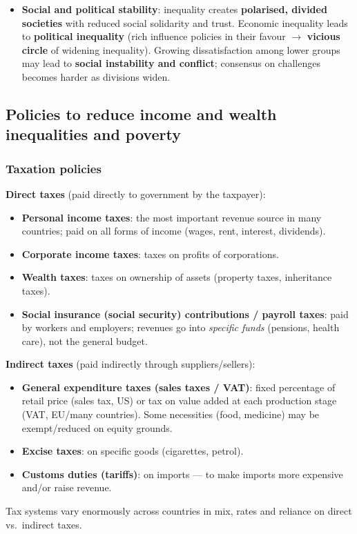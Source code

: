 \begin{itemize}
\begin{itemize}
    \item \textbf{Social problems}: crime, drug use, family breakdowns, homelessness.
    \item \textbf{Inability to realise full potential} $\to$ waste of human talent $\to$ lower growth (PPC/LRAS shift less).
  \end{itemize}
  \item \textbf{Social and political stability}: inequality creates \textbf{polarised, divided societies} with reduced social solidarity and trust. Economic inequality leads to \textbf{political inequality} (rich influence policies in their favour $\to$ \textbf{vicious circle} of widening inequality). Growing dissatisfaction among lower groups may lead to \textbf{social instability and conflict}; consensus on challenges becomes harder as divisions widen.
\end{itemize}
\subsection{Policies to reduce income and wealth inequalities and poverty}
\subsubsection*{Taxation policies}
\textbf{Direct taxes} (paid directly to government by the taxpayer):
\begin{itemize}
  \item \textbf{Personal income taxes}: the most important revenue source in many countries; paid on all forms of income (wages, rent, interest, dividends).
  \item \textbf{Corporate income taxes}: taxes on profits of corporations.
  \item \textbf{Wealth taxes}: taxes on ownership of assets (property taxes, inheritance taxes).
  \item \textbf{Social insurance (social security) contributions / payroll taxes}: paid by workers and employers; revenues go into \textit{specific funds} (pensions, health care), not the general budget.
\end{itemize}
\textbf{Indirect taxes} (paid indirectly through suppliers/sellers):
\begin{itemize}
  \item \textbf{General expenditure taxes (sales taxes / VAT)}: fixed percentage of retail price (sales tax, US) or tax on value added at each production stage (VAT, EU/many countries). Some necessities (food, medicine) may be exempt/reduced on equity grounds.
  \item \textbf{Excise taxes}: on specific goods (cigarettes, petrol).
  \item \textbf{Customs duties (tariffs)}: on imports --- to make imports more expensive and/or raise revenue.
\end{itemize}
Tax systems vary enormously across countries in mix, rates and reliance on direct vs.\ indirect taxes.

